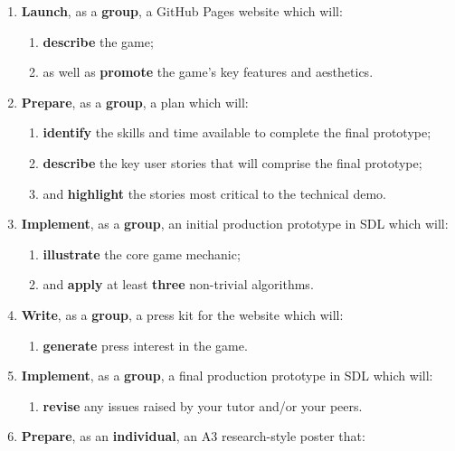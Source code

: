 \documentclass{../fal_assignment}
\begin{document}
\begin{enumerate}[label=(\Alph*)]
    \item \textbf{Launch}, as a \textbf{group}, a GitHub Pages website which will:
    	\begin{enumerate}[label=\roman*.]
    		\item \textbf{describe} the game;
    		\item as well as \textbf{promote} the game's key features and aesthetics.
	\end{enumerate}
    \item \textbf{Prepare}, as a \textbf{group}, a plan which will:
    	\begin{enumerate}[label=\roman*.]
    	    	\item \textbf{identify} the skills and time available to complete the final prototype;
    		\item \textbf{describe} the key user stories that will comprise the final prototype;
    		\item and \textbf{highlight} the stories most critical to the technical demo.
	\end{enumerate}
    \item \textbf{Implement}, as a \textbf{group}, an initial production prototype in SDL which will:
    	\begin{enumerate}[label=\roman*.]
    		\item \textbf{illustrate} the core game mechanic;
    		\item and \textbf{apply} at least \textbf{three} non-trivial algorithms.
	\end{enumerate}
    \item \textbf{Write}, as a \textbf{group}, a press kit for the website which will:
    	\begin{enumerate}[label=\roman*.]
    		\item \textbf{generate} press interest in the game.
	\end{enumerate}	
    \item \textbf{Implement}, as a \textbf{group}, a final production prototype  in SDL which will:
    	\begin{enumerate}[label=\roman*.]
    		\item \textbf{revise} any issues raised by your tutor and/or your peers.
	\end{enumerate}
    \item \textbf{Prepare}, as an \textbf{individual}, an A3 research-style poster that:
    	\begin{enumerate}[label=\roman*.]

\end{enumerate}
\end{enumerate}
\end{document}
